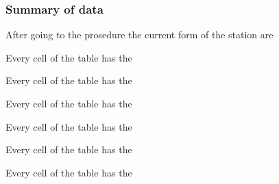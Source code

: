 \subsubsection{Summary of data}

After going to the prosedure the current form of the station are

\begin{table}
	\begin{adjustwidth}{-1in}{-0.8in}
	
	\end{adjustwidth}
	\caption[Table of station statitics for air]{Every cell of the table has the }
\end{table}

\begin{table}
	\begin{adjustwidth}{-1in}{-0.8in}
	
	\end{adjustwidth}
	\caption[Table of station statitics for soil 10cm]{Every cell of the table has the }
\end{table}

\begin{table}
	\begin{adjustwidth}{-1in}{-0.8in}
	
	\end{adjustwidth}
	\caption[Table of station statitics for soil 20cm]{Every cell of the table has the }
\end{table}
\begin{table}
	\begin{adjustwidth}{-1in}{-0.8in}
	
	\end{adjustwidth}
	\caption[Table of station statitics for air]{Every cell of the table has the }
\end{table}


\begin{table}
	\begin{adjustwidth}{-1in}{-0.8in}
	
	\end{adjustwidth}
	\caption[Table of station statitics for soil 10cm]{Every cell of the table has the }
\end{table}


\begin{table}
	\begin{adjustwidth}{-1in}{-0.8in}
	
	\end{adjustwidth}
	\caption[Table of station statitics for soil 20cm]{Every cell of the table has the }
\end{table}

